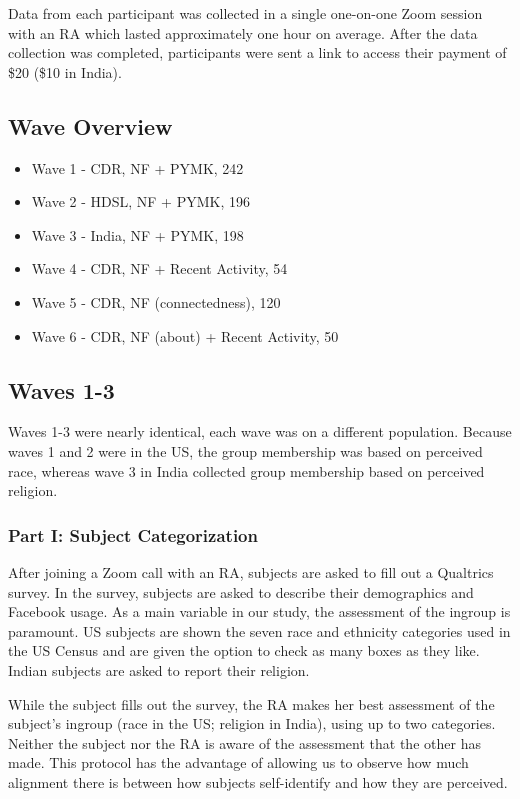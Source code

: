 \documentclass[12pt,letterpaper]{article}
\begin{document}
Data from each participant was collected in a single one-on-one Zoom session with an RA which lasted approximately one hour on average. After the data collection was completed, participants were sent a link to access their payment of \$20 (\$10 in India).

\subsection{Wave Overview}
\begin{itemize}
    \item Wave 1 - CDR, NF + PYMK, 242
    \item Wave 2 - HDSL, NF + PYMK, 196
    \item Wave 3 - India, NF + PYMK, 198
    \item Wave 4 - CDR, NF + Recent Activity, 54
    \item Wave 5 - CDR, NF (connectedness), 120
    \item Wave 6 - CDR, NF (about) + Recent Activity, 50
\end{itemize}

\subsection{Waves 1-3}

Waves 1-3 were nearly identical, each wave was on a different population. Because waves 1 and 2 were in the US, the group membership was based on perceived race, whereas wave 3 in India collected group membership based on perceived religion.

\subsubsection{Part I: Subject Categorization} After joining a Zoom call with an RA, subjects are asked to fill out a Qualtrics survey. In the survey, subjects are asked to describe their demographics and Facebook usage. As a main variable in our study, the assessment of the ingroup is paramount. US subjects are shown the seven race and ethnicity categories used in the US Census and are given the option to check as many boxes as they like. Indian subjects are asked to report their religion.

While the subject fills out the survey, the RA makes her best assessment of the subject’s ingroup (race in the US; religion in India), using up to two categories. Neither the subject nor the RA is aware of the assessment that the other has made. This protocol has the advantage of allowing us to observe how much alignment there is between how subjects self-identify and how they are perceived.
\end{document}
